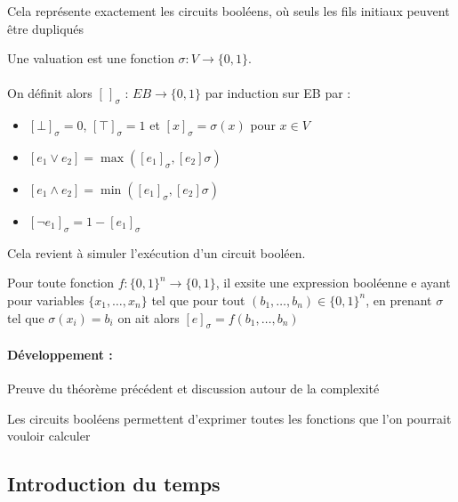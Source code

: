 \begin{rem}
	Cela représente exactement les circuits booléens, où seuls les fils initiaux peuvent être dupliqués
\end{rem}

\begin{definition}
	Une valuation est une fonction $\sigma :V \to \{0,1\}$.
	\\
	\\
	On définit alors $[\,]_\sigma$ : $EB \to \{0, 1\}$ par induction sur EB par :\begin{itemize}[label=$\bullet$]
		\item $[\bot]_\sigma = 0$, $[\top]_\sigma = 1$ et $[x]_\sigma = \sigma(x)$ pour $x \in V$
		\item $[e_1 \vee e_2] = \max([e_1]_\sigma, [e_2]\sigma)$
		\item $[e_1 \wedge e_2] = \min([e_1]_\sigma, [e_2]\sigma)$
		\item $[\neg e_1]_\sigma = 1-[e_1]_\sigma$
	\end{itemize}
\end{definition}

\begin{rem}
	Cela revient à simuler l'exécution d'un circuit booléen.
\end{rem}

\begin{theorem}
	Pour toute fonction $f : \{0, 1\}^n \to \{0, 1\}$, il exsite une expression booléenne e ayant pour variables $\{x_1, \dots, x_n\}$ tel que pour tout $(b_1, \dots, b_n)\in\{0,1\}^n$, en prenant $\sigma$ tel que $\sigma(x_i) = b_i$ on ait alors $[e]_\sigma = f(b_1, \dots, b_n)$
\end{theorem}

\paragraph{Développement :} Preuve du théorème précédent et discussion autour de la complexité

\begin{personalise}[Conclusion]
	Les circuits booléens permettent d'exprimer toutes les fonctions que l'on pourrait vouloir calculer
\end{personalise}

\subsection{Introduction du temps}


